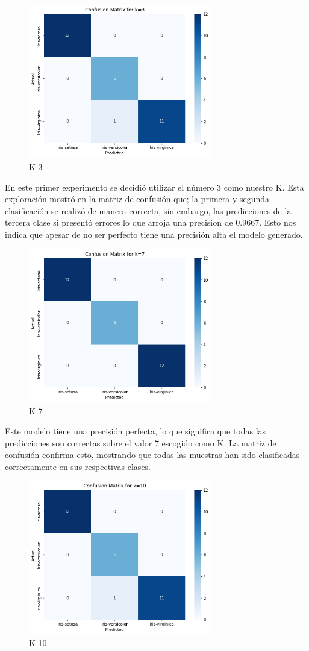 \documentclass[conference]{IEEEtran}
\begin{document}
\begin{figure}[ht]
  \includegraphics[width=80mm]{images/k3.png}
  \caption{K 3}\label{fig7}
\end{figure}
\FloatBarrier
En este primer experimento se decidió utilizar el número 3 como nuestro K. Esta exploración mostró en la matriz de confusión que; la primera y segunda clasificación se realizó de manera correcta, sin embargo, las predicciones de la tercera clase si presentó errores lo que arroja una precision de 0.9667. Esto nos indica que apesar de no ser perfecto tiene una precisión alta el modelo generado.
\begin{figure}[ht]
  \includegraphics[width=80mm]{images/K7.png}
  \caption{K 7}\label{fig8}
\end{figure}
\FloatBarrier
Este modelo tiene una precisión perfecta, lo que significa que todas las predicciones son correctas sobre el valor 7 escogido como K. La matriz de confusión confirma esto, mostrando que todas las muestras han sido clasificadas correctamente en sus respectivas clases.

\begin{figure}[H]
  \includegraphics[width=80mm]{images/K10.png}
  \caption{K 10}\label{fig9}
\end{figure}
\FloatBarrier
\end{document}
